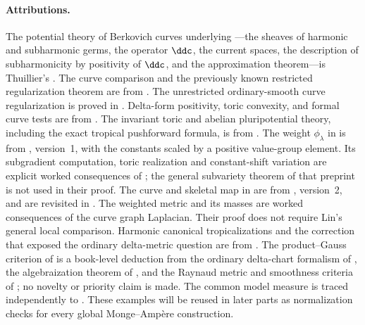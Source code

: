 \paragraph{Attributions.}
The potential theory of Berkovich curves underlying
---the
sheaves of harmonic and subharmonic germs, the operator $\ddc$, the
current spaces, the description of subharmonicity by positivity of $\ddc$,
and the approximation theorem---is Thuillier's \cite{Thu05}.
The curve comparison and the previously known restricted regularization
theorem are from \cite{Wanner19}.  The unrestricted ordinary-smooth curve
regularization is proved in
.  Delta-form positivity,
toric convexity, and formal curve
tests are from \cite{GK19}.  The invariant toric and abelian
pluripotential theory, including the exact tropical pushforward formula, is
from \cite{BGJKK25}.  The weight $\phi_\lambda$ in
 is from \cite[Remark~9.8]{Lin26},
version~1, with the constants scaled by a positive value-group element.
Its subgradient computation, toric realization and constant-shift variation
are explicit worked consequences of ; the
general subvariety theorem of that preprint is not used in their proof.
The curve and skeletal map in
 are from
\cite[Examples~2.6, 8.7 and~8.11]{BPR12}, version~2, and are revisited
in \cite[Example~10.1]{Lin26}.  The weighted metric and its masses are
worked consequences of the curve graph Laplacian.  Their proof does
not require Lin's general local comparison.
Harmonic canonical tropicalizations and the correction
that exposed the ordinary delta-metric question are from \cite{GJR26}.  The
product--Gauss criterion of
 is a book-level deduction from the
ordinary delta-chart formalism of \cite{GK17}, the algebraization theorem of
\cite{Gub16}, and the Raynaud metric and smoothness criteria of
\cite{CLD25}; no novelty or priority claim is made.  The common model measure
is traced independently to \cite{CL06,CLD25,GK17}.  These examples
will be reused in later parts as normalization checks for every global
Monge--Amp\`ere construction.

